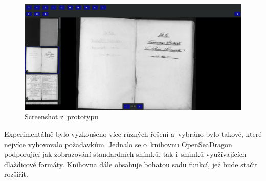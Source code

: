 \begin{figure}[htbp]
\centering
    \includegraphics[scale=.2]{obrazky-figures/design/prototype.png}
    \caption{Screenshot z~prototypu}
\end{figure}

\noindent
Experimentálně bylo vyzkoušeno více různých řešení a~vybráno bylo takové, které nejvíce vyhovovalo požadavkům. Jednalo se o~knihovnu OpenSeaDragon podporující jak zobrazování standardních snímků, tak i~snímků využívajících dlaždicové formáty. Knihovna dále obsahuje bohatou sadu funkcí, jež bude stačit rozšířit.